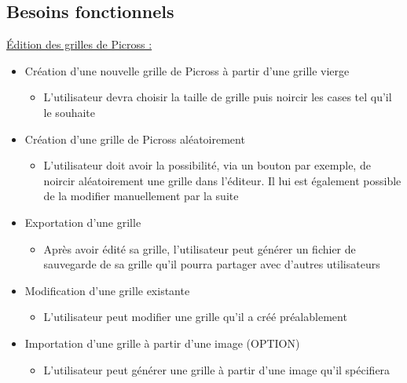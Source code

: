 \documentclass[a4paper, 12pt, twoside]{article}
\begin{document}
\subsection{Besoins fonctionnels}

\ul{\'Edition des grilles de Picross :}\newline

\begin{itemize}\setlength{\itemsep}{5mm}

 \item[\textbullet] Création d'une nouvelle grille de Picross à partir d'une grille vierge\newline
 \begin{itemize}
  \item L'utilisateur devra choisir la taille de grille puis noircir les cases tel qu'il le souhaite
 \end{itemize}

 \item[\textbullet] Création d'une grille de Picross aléatoirement\newline
 \begin{itemize}
  \item L'utilisateur doit avoir la possibilité, via un bouton par exemple, de noircir aléatoirement une grille dans l'éditeur. Il lui est également possible de la modifier manuellement par la suite
 \end{itemize}

 \item[\textbullet] Exportation d'une grille\newline
 \begin{itemize}
  \item Après avoir édité sa grille, l'utilisateur peut générer un fichier de sauvegarde de sa grille qu'il pourra partager avec d'autres utilisateurs
 \end{itemize}

 \item[\textbullet] Modification d'une grille existante\newline
 \begin{itemize}
  \item L'utilisateur peut modifier une grille qu'il a créé préalablement
 \end{itemize}

 \item[\textbullet] Importation d'une grille à partir d'une image (OPTION) \newline
 \begin{itemize}
  \item L'utilisateur peut générer une grille à partir d'une image qu'il spécifiera\newline
 \end{itemize}
\end{itemize}
\end{document}
